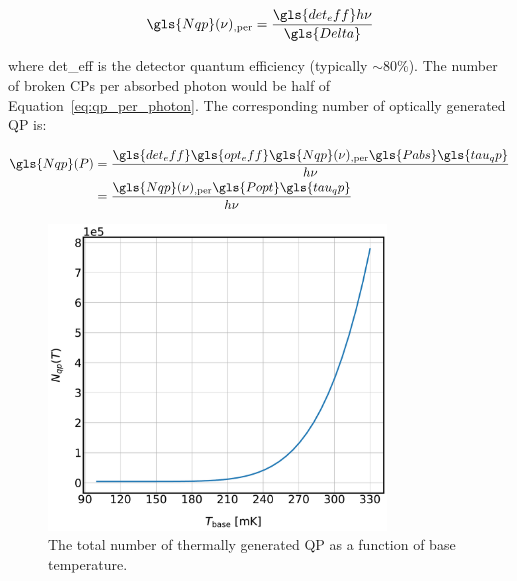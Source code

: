 \begin{equation}\label{eq:qp_per_photon}
  \gls{Nqp}(\nu)_{\mathrm{,per}} = \frac{\gls{det_eff} h\nu}{\gls{Delta}}
\end{equation}

where \gls{det_eff} is the detector quantum efficiency (typically $\sim$80\%). The number of broken CPs per absorbed photon would be half of Equation~\ref{eq:qp_per_photon}. The corresponding number of optically generated QP is:

\begin{equation}\label{eq:Nqp_P}
  \begin{aligned}
  \gls{Nqp}(P) &= \frac{ \gls{det_eff}\gls{opt_eff} \gls{Nqp}(\nu)_{\mathrm{,per}} \gls{Pabs}\gls{tau_qp}}{h\nu} \\
              &= \frac{\gls{Nqp}(\nu)_{\mathrm{,per}}\gls{Popt}\gls{tau_qp}}{h\nu}
  \end{aligned}
\end{equation}

\begin{figure}[!htbp]
\centering
\includegraphics[width=0.8\textwidth]{figures/kid_model/Nqp_T}
\caption[~ as a function of base temperature.]{The total number of thermally generated QP as a function of base temperature.}
\label{fig:Nqp_T}
\end{figure}

